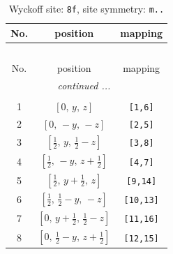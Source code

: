 \documentclass[fleqn,8pt]{jsarticle}
\begin{document}
\begin{longtable}{ccc}
\caption{Wyckoff site: {\tt 8f}, site symmetry: {\tt m..}}
 \\
 \hline \hline
No. & position & mapping \\ \hline \endfirsthead

\multicolumn{2}{l}{\tablename\ \thetable{}} \\
 \hline \hline
No. & position & mapping \\ \hline \endhead

 \hline \hline
\multicolumn{2}{r}{\footnotesize\it continued ...} \\ \endfoot

 \hline \hline
\multicolumn{2}{r}{} \\ \endlastfoot

1 & $\left[ 0,\, y,\, z \right]$ & {\tt [1,6]} \\ \hline
2 & $\left[ 0,\, - y,\, - z \right]$ & {\tt [2,5]} \\ \hline
3 & $\left[ \frac{1}{2},\, y,\, \frac{1}{2} - z \right]$ & {\tt [3,8]} \\ \hline
4 & $\left[ \frac{1}{2},\, - y,\, z + \frac{1}{2} \right]$ & {\tt [4,7]} \\ \hline
5 & $\left[ \frac{1}{2},\, y + \frac{1}{2},\, z \right]$ & {\tt [9,14]} \\ \hline
6 & $\left[ \frac{1}{2},\, \frac{1}{2} - y,\, - z \right]$ & {\tt [10,13]} \\ \hline
7 & $\left[ 0,\, y + \frac{1}{2},\, \frac{1}{2} - z \right]$ & {\tt [11,16]} \\ \hline
8 & $\left[ 0,\, \frac{1}{2} - y,\, z + \frac{1}{2} \right]$ & {\tt [12,15]} \\
\end{longtable}
\renewcommand{\arraystretch}{1.2}
\end{document}
